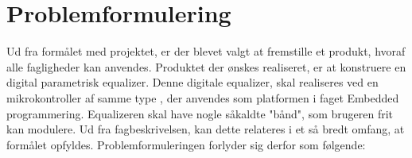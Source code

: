 \section{Problemformulering}
%
%


%
Ud fra formålet med projektet, er der blevet valgt at fremstille et produkt, hvoraf alle fagligheder kan anvendes. Produktet der ønskes realiseret, er at konstruere en digital parametrisk equalizer. Denne digitale equalizer, skal realiseres ved en mikrokontroller af samme type , der anvendes som platformen i faget Embedded programmering. Equalizeren skal have nogle såkaldte "bånd", som brugeren frit kan modulere. Ud fra fagbeskrivelsen, kan dette relateres i et så bredt omfang, at formålet opfyldes. Problemformuleringen forlyder sig derfor som følgende: \\

